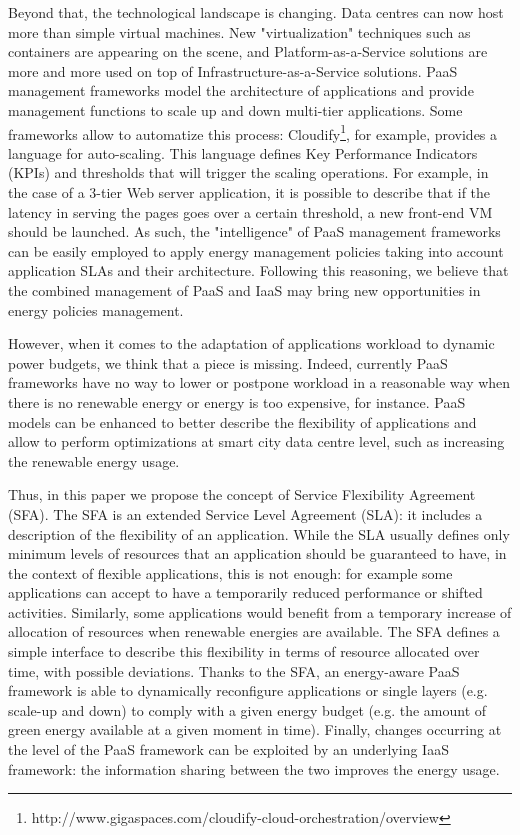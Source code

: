 Beyond that, the technological landscape is changing.
Data centres can now host more than simple virtual machines.
New "virtualization" techniques such as containers are appearing on the scene, and Platform-as-a-Service solutions are more and more used on top of Infrastructure-as-a-Service solutions.
PaaS management frameworks model the architecture of applications and provide management functions to scale up and down multi-tier applications. 
Some frameworks allow to automatize this process: Cloudify\footnote{http://www.gigaspaces.com/cloudify-cloud-orchestration/overview}, for example, provides a language for auto-scaling.
This language defines Key Performance Indicators (KPIs) and thresholds that will trigger the scaling operations.
For example, in the case of a 3-tier Web server application, it is possible to describe that if the latency in serving the pages goes over a certain threshold, a new front-end VM should be launched.
As such, the "intelligence" of PaaS management frameworks can be easily employed to apply energy management policies taking into account application SLAs and their architecture.
Following this reasoning, we believe that the combined management of PaaS and IaaS may bring new opportunities in energy policies management.

However, when it comes to the adaptation of applications workload to dynamic power budgets, we think that a piece is missing.
Indeed, currently PaaS frameworks have no way to lower or postpone workload in a reasonable way when there is no renewable energy or energy is too expensive, for instance.
PaaS models can be enhanced to better describe the flexibility of applications and allow to perform optimizations at smart city data centre level, such as increasing the renewable energy usage.

Thus, in this paper we propose the concept of Service Flexibility Agreement (SFA). 
The SFA is an extended Service Level Agreement (SLA): it includes a description of the flexibility of an application.
While the SLA usually defines only minimum levels of resources that an application should be guaranteed to have, in the context of flexible applications, this is not enough: for example some applications can accept to have a temporarily reduced performance or shifted activities.
Similarly, some applications would benefit from a temporary increase of allocation of resources when renewable energies are available.
The SFA defines a simple interface to describe this flexibility in terms of resource allocated over time, with possible deviations. 
Thanks to the SFA, an energy-aware PaaS framework is able to dynamically reconfigure applications or single layers (e.g. scale-up and down) to comply with a given energy budget (e.g. the amount of green energy available at a given moment in time).
Finally, changes occurring at the level of the PaaS framework can be exploited by an underlying IaaS framework: the information sharing between the two improves the energy usage.

